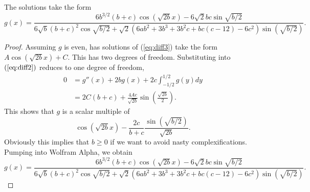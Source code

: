 \begin{theorem}
	The solutions take the form
		\[ g(x) = \frac{6b^{3/2} (b + c) \cos(\sqrt{2b} x) - 6 \sqrt{2} b c \sin{\sqrt{b/2}}}{6 \sqrt{b} (b + c)^2 \cos{\sqrt{b/2}} + \sqrt{2} (6 a b^2 + 3b^3 + 3b^2 c + b c (c - 12) - 6c^2) \sin (\sqrt{b/2})}. \]	
\end{theorem}

\begin{proof}
	Assuming $g$ is even, has solutions of (\ref{eq:diff3}) take the form $A \cos(\sqrt{2b} x) + C$. This has two degrees of freedom. Substituting into $(\ref{eq:diff2})$ reduces to one degree of freedom, 
	\begin{align*}
		0 
			&= g'' (x) + 2b g(x) + 2c \int_{-1/2}^{1/2} g(y) dy \\
			&= 2C (b + c) + \frac{4A c}{\sqrt{2b}} \sin\left( \frac{\sqrt{2b}}{2} \right).
	\end{align*}
This shows that $g$ is a scalar multiple of  
	\[ \cos(\sqrt{2b} x) - \frac{2c}{b + c} \frac{\sin\left( \sqrt{b/2} \right)}{\sqrt{2b}}. \]	
Obviously this implies that $b \geq 0$ if we want to avoid nasty complexifications. Pumping into Wolfram Alpha, we obtain
	\[ g(x) = \frac{6b^{3/2} (b + c) \cos(\sqrt{2b} x) - 6 \sqrt{2} b c \sin{\sqrt{b/2}}}{6 \sqrt{b} (b + c)^2 \cos{\sqrt{b/2}} + \sqrt{2} (6 a b^2 + 3b^3 + 3b^2 c + b c (c - 12) - 6c^2) \sin (\sqrt{b/2})}. \]	
\end{proof}	
